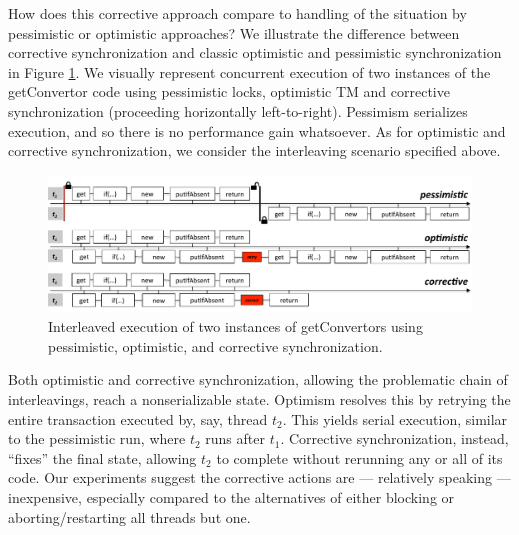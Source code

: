 How does this corrective approach compare to handling of the situation by pessimistic or optimistic approaches?
%
We illustrate the difference between corrective synchronization and classic optimistic and pessimistic synchronization in Figure \ref{Fi:motivatingOverview}. We visually represent concurrent execution of two instances of the \textsf{getConvertor} code using pessimistic locks, optimistic TM and corrective synchronization (proceeding horizontally left-to-right). Pessimism serializes execution, and so there is no performance gain whatsoever. As for optimistic and corrective synchronization, we consider the interleaving scenario specified above. %
%
\begin{figure}[t]
	\begin{center}
	\includegraphics[width=\textwidth]{OverviewSlide.pdf}
	\end{center}
	\vspace{-0.6cm}\caption{\label{Fi:motivatingOverview}Interleaved execution of two instances of \textsf{getConvertors} using pessimistic, optimistic, and corrective synchronization.}
        \vspace{-0.4cm}
\end{figure}
%
Both optimistic and corrective synchronization, allowing the problematic chain of interleavings, reach a nonserializable state. Optimism resolves this by retrying the entire transaction executed by, say, thread $t_2$. This yields serial execution, similar to the pessimistic run, where $t_2$ runs after $t_1$. Corrective synchronization, instead, ``fixes'' the final state, allowing $t_2$ to complete without rerunning any or all of its code.
%
Our experiments suggest the corrective actions are --- relatively speaking --- inexpensive, especially compared to the alternatives of either blocking or aborting/restarting all threads but one.


